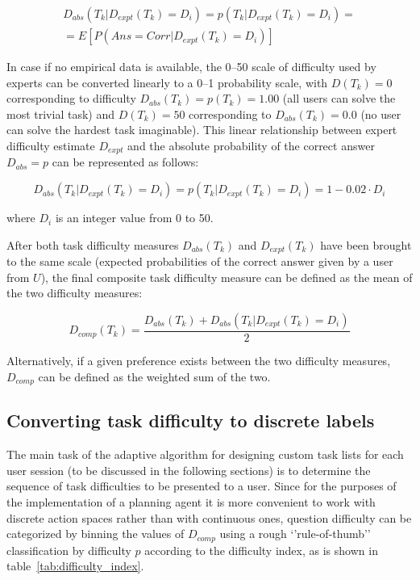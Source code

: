 \begin{equation}
    \begin{split}
        D_{abs}(T_k | D_{expt}(T_k) = D_i) = p(T_k | D_{expt}(T_k) = D_i) = \\
        = E[P(Ans=Corr | D_{expt}(T_k) = D_i)]
    \end{split}
\end{equation}

In case if no empirical data is available, the 0--50 scale of difficulty used by experts can be converted linearly to a 0--1 probability scale, with $D(T_k)=0$ corresponding to difficulty $D_{abs}(T_k)=p(T_k)=1.00$ (all users can solve the most trivial task) and $D(T_k)=50$ corresponding to $D_{abs}(T_k)=0.0$ (no user can solve the hardest task imaginable).
This linear relationship between expert difficulty estimate $D_{expt}$ and the absolute probability of the correct answer $D_{abs}=p$ can be represented as follows:

\begin{equation} \label{eq:dexpt_to_dabs_conversion}
    D_{abs}(T_k | D_{expt}(T_k) = D_i) = p(T_k | D_{expt}(T_k) = D_i) = 1 - 0.02 \cdot D_i
\end{equation}

where $D_i$ is an integer value from 0 to 50.

After both task difficulty measures $D_{abs}(T_k)$ and $D_{expt}(T_k)$ have been brought to the same scale (expected probabilities of the correct answer given by a user from $U$), the final composite task difficulty measure can be defined as the mean of the two difficulty measures:

\begin{equation}
    D_{comp}(T_k) = \frac{D_{abs}(T_k) + D_{abs}(T_k | D_{expt}(T_k) = D_i)} {2}
\end{equation}

Alternatively, if a given preference exists between the two difficulty measures, $D_{comp}$ can be defined as the weighted sum of the two.

\subsection{Converting task difficulty to discrete labels} \label{subsec:q2_discrete_conversion}

The main task of the adaptive algorithm for designing custom task lists for each user session (to be discussed in the following sections) is to determine the sequence of task difficulties to be presented to a user.
Since for the purposes of the implementation of a planning agent it is more convenient to work with discrete action spaces rather than with continuous ones, question difficulty can be categorized by binning the values of $D_{comp}$ using a rough `'rule-of-thumb'' classification by difficulty $p$ according to the difficulty index, as is shown in table~\ref{tab:difficulty_index}.

